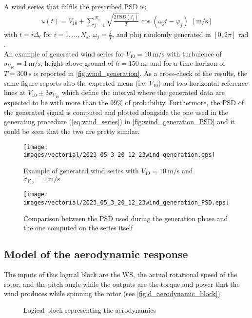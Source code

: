 A wind series that fulfils the prescribed \acrshort{PSD} is:
\begin{gather}
    u(t) = V_{10}+\sum_{j=1}^{N_s}\sqrt{\frac{2PSD(f_j)}{T}}\cos{(\omega_jt-\varphi_j)} \ \ \left[\si{\meter \per \second}\right]
    \label{eq:wind_series}
\end{gather}
with $t = i\Delta_t$ for $i=1,\dots,N_s$, $\omega_j=\frac{j}{T}$, and \acrshort{phij} randomly generated in $ \left[0, 2\pi\right]$ $\si{\radian}$. \\
An example of generated wind series for $V_{10}=10 \ \si{\meter\per\second}$ with turbulence of $\sigma_{V_{10}}=1 \ \si{\meter\per\second}$, height above ground of $h=150 
 \ \si{\meter}$, and for a time horizon of $T = 300 \ \si{\second}$ is reported in \autoref{fig:wind_generation}. As a cross-check of the results, the same figure reports also the expected mean (i.e. $V_{10}$) and two horizontal reference lines at $V_{10}\pm3\sigma_{V_{10}}$ which define the interval where the generated data are expected to be with more than the 99\% of probability. Furthermore, the PSD of the generated signal is computed and plotted alongside the one used in the generating procedure (\autoref{eq:wind_series}) in \autoref{fig:wind_generation_PSD} and it could be seen that the two are pretty similar. 
\begin{figure}[htb]
    \centering
    \texttt{[image: images/vectorial/2023\_05\_3\_20\_12\_23wind\_generation.eps]}
    \caption{Example of generated wind series with $V_{10}=10 \ \si{\meter\per\second}$ and $\sigma_{V_{10}}=1 \ \si{\meter\per\second}$ }
    \label{fig:wind_generation}
\end{figure}

\begin{figure}[htb]
    \centering
    \texttt{[image: images/vectorial/2023\_05\_3\_20\_12\_23wind\_generation\_PSD.eps]}
    \caption{Comparison between the PSD used during the generation phase and the one computed on the series itself}
    \label{fig:wind_generation_PSD}
\end{figure}

\subsection[Aerodynamic]{Model of the aerodynamic response}
The inputs of this logical block are the WS, the actual rotational speed of the rotor, and the pitch angle while the outputs are the torque and power that the wind produces while spinning the rotor (see \autoref{fig:d_aerodynamic_block}). 
\begin{figure}
  \centering
  
  \caption{Logical block representing the aerodynamics}
  \label{fig:d_aerodynamic_block}
\end{figure}

